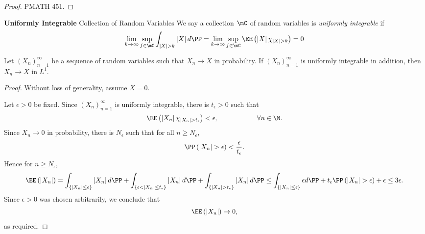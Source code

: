 \documentclass[stat901]{subfiles}
\begin{document}
    \begin{proof}
        PMATH 451.
    \end{proof}

    \begin{definition}{\textbf{Uniformly Integrable} Collection of Random Variables}
        We say a collection $\mC$ of random variables is \emph{uniformly integrable} if
        \begin{equation*}
                \lim_{k\to\infty}\sup_{f\in\mC} \int_{\left| X \right|>k} \left| X \right|d\PP = \lim_{k\to\infty}\sup_{f\in\mC}\EE\left( \left| X \right|\chi_{\left| X \right|>k} \right) = 0
        \end{equation*}
    \end{definition}

    \begin{prop}{}
        Let $\left( X_{n} \right)^{\infty}_{n=1}$ be a sequence of random variables such that $X_n\to X$ in probability. If $\left( X_{n} \right)^{\infty}_{n=1}$ is uniformly integrable in addition, then $X_n\to X$ in $L^1$.
    \end{prop}

    \begin{proof}
        Without loss of generality, assume $X=0$.

        Let $\epsilon>0$ be fixed. Since $\left( X_{n} \right)^{\infty}_{n=1}$ is uniformly integrable, there is $t_{\epsilon}>0$ such that
        \begin{equation*}
            \EE\left( \left| X_n \right|\chi_{\left| X_n \right|>t_{\epsilon}} \right) < \epsilon, \hspace{2cm}\forall n\in\N.
        \end{equation*}
        Since $X_n\to 0$ in probability, there is $N_{\epsilon}$ such that for all $n\geq N_{\epsilon}$,
        \begin{equation*}
            \PP\left( \left| X_n \right|>\epsilon \right) < \frac{\epsilon}{t_{\epsilon}}.
        \end{equation*}
        Hence for $n\geq N_{\epsilon}$,
        \begin{equation*}
            \EE\left( \left| X_n \right| \right) = \int_{\left\lbrace \left| X_n \right|\leq\epsilon \right\rbrace} \left| X_n \right|d\PP + \int_{\left\lbrace \epsilon<\left| X_n \right|\leq t_{\epsilon} \right\rbrace} \left| X_n \right|d\PP + \int_{\left\lbrace \left| X_n \right|>t_{\epsilon} \right\rbrace}\left| X_n \right|d\PP \leq \int_{\left\lbrace \left| X_n \right|\leq\epsilon \right\rbrace} \epsilon d\PP + t_{\epsilon} \PP\left( \left| X_n \right|>\epsilon \right)+ \epsilon \leq 3\epsilon.
        \end{equation*}
        Since $\epsilon>0$ was chosen arbitrarily, we conclude that
        \begin{equation*}
            \EE\left( \left| X_n \right| \right) \to 0,
        \end{equation*}
        as required.
    \end{proof}
        
\end{document}

